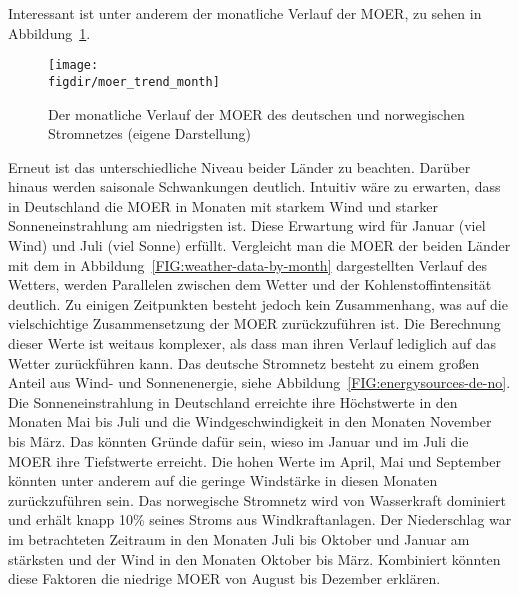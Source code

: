 Interessant ist unter anderem der monatliche Verlauf der \ac{MOER}, zu sehen in Abbildung~\ref{FIG:moer_trend_month}.
\begin{figure}
 \caption[Monatlicher Verlauf der MOER von Deutschland und Norwegen]{Der monatliche Verlauf der MOER des deutschen und norwegischen Stromnetzes (eigene Darstellung)}
 {\texttt{[image: \\figdir/moer\_trend\_month]}}
 \label{FIG:moer_trend_month}
\end{figure}
Erneut ist das unterschiedliche Niveau beider Länder zu beachten.
Darüber hinaus werden saisonale Schwankungen deutlich.
Intuitiv wäre zu erwarten, dass in Deutschland die \ac{MOER} in Monaten mit starkem Wind und starker Sonneneinstrahlung am niedrigsten ist.
Diese Erwartung wird für Januar (viel Wind) und Juli (viel Sonne) erfüllt.
Vergleicht man die \ac{MOER} der beiden Länder mit dem in Abbildung~\ref{FIG:weather-data-by-month} dargestellten Verlauf des Wetters, werden Parallelen zwischen dem Wetter und der Kohlenstoffintensität deutlich.
Zu einigen Zeitpunkten besteht jedoch kein Zusammenhang, was auf die vielschichtige Zusammensetzung der \ac{MOER} zurückzuführen ist.
Die Berechnung dieser Werte ist weitaus komplexer, als dass man ihren Verlauf lediglich auf das Wetter zurückführen kann.
Das deutsche Stromnetz besteht zu einem großen Anteil aus Wind- und Sonnenenergie, siehe Abbildung~\ref{FIG:energysources-de-no}.
Die Sonneneinstrahlung in Deutschland erreichte ihre Höchstwerte in den Monaten Mai bis Juli und die Windgeschwindigkeit in den Monaten November bis März.
Das könnten Gründe dafür sein, wieso im Januar und im Juli die \ac{MOER} ihre Tiefstwerte erreicht.
Die hohen Werte im April, Mai und September könnten unter anderem auf die geringe Windstärke in diesen Monaten zurückzuführen sein.
Das norwegische Stromnetz wird von Wasserkraft dominiert und erhält knapp 10\% seines Stroms aus Windkraftanlagen.
Der Niederschlag war im betrachteten Zeitraum in den Monaten Juli bis Oktober und Januar am stärksten und der Wind in den Monaten Oktober bis März.
Kombiniert könnten diese Faktoren die niedrige \ac{MOER} von August bis Dezember erklären.

